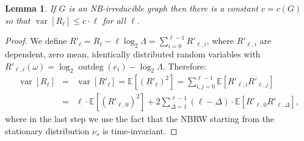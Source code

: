\documentclass{article}
\newtheorem{lemma}[theorem]{Lemma}
\newcommand{\E}{\mathbb{E}} %
\DeclareMathOperator{\var}{var}
\DeclareMathOperator{\outdeg}{outdeg}
\begin{document}
\begin{lemma}\label{lemma:variance_ub}
    If $G$ is an NB-irreducible graph then there is a constant $c=c(G)$ so that $\var[R_\ell] \leq c \cdot \ell$ for all $\ell$.
\end{lemma}

\begin{proof}
    We define $R'_\ell = R_\ell - \ell \log_2\Lambda = \sum_{i=0}^{\ell-1} R'_{\ell,i}$, 
    where $R'_{\ell,i}$ are dependent, zero mean, identically distributed random variables with $R'_{\ell,i}(\omega) = \log_2 \outdeg(e_i) - \log_2\Lambda$.
    Therefore:
    \begin{eqnarray*}
        \var[R_\ell] 
        &=& \var[R'_\ell]
        =   \E\!\left[ {(R'_\ell)}^2\right] 
        =   \sum_{i,j=0}^{\ell-1} \E\!\left[ R'_{\ell,i} R'_{\ell,j}\right] \\
        &=& \ell \cdot \E\!\left[ {(R'_{\ell,0})}^2\right] + 2 \sum_{\Delta=1}^{\ell-1} (\ell-\Delta) \cdot \E\!\left[ R'_{\ell,0} R'_{\ell,\Delta}\right],
    \end{eqnarray*}
    where in the last step we use the fact that the NBRW starting from the stationary distribution 
    $\nu_s$ is time-invariant.


\end{proof}
\end{document}
